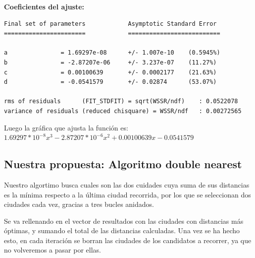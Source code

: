 \documentclass[a4]{article}
\begin{document}
\newpage
\textbf{Coeficientes del ajuste:}
\begin{verbatim}
Final set of parameters            Asymptotic Standard Error
=======================            ==========================

a               = 1.69297e-08      +/- 1.007e-10    (0.5945%)
b               = -2.87207e-06     +/- 3.237e-07    (11.27%)
c               = 0.00100639       +/- 0.0002177    (21.63%)
d               = -0.0541579       +/- 0.02874      (53.07%)

rms of residuals      (FIT_STDFIT) = sqrt(WSSR/ndf)    : 0.0522078
variance of residuals (reduced chisquare) = WSSR/ndf   : 0.00272565
\end{verbatim}

Luego la gráfica que ajusta la función es: $1.69297*10^{-8}x^3 - 2.87207*10^{-6}x^2 + 0.00100639x - 0.0541579$ 

\begin{figure}[H]
  \centering
{}
\end{figure}

\subsection{Nuestra propuesta: Algoritmo double nearest}

Nuestro algortimo busca cuales son las dos cuidades cuya suma de sus
distancias es la mínima respecto a la última ciudad recorrida, por los que se seleccionan dos ciudades cada vez, gracias a tres bucles
anidados.

Se va rellenando en el vector de resultados con las ciudades con
distancias más óptimas, y sumando el total de las distancias
calculadas. Una vez se ha hecho esto, en cada iteración se borran las
ciudades de los candidatos a recorrer, ya que no volveremos a pasar
por ellas.
\end{document}
